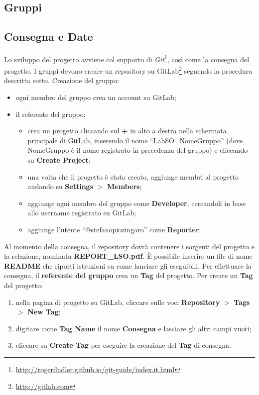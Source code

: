 \documentclass[12pt,a4paper,draft]{article}
\begin{document}
\subsection{Gruppi}
%


\subsection{Consegna e Date}
%
Lo sviluppo del progetto avviene col supporto di \textit{Git}\footnote{\url{http://rogerdudler.github.io/git-guide/index.it.html}}, così come la consegna del progetto.
I gruppi devono creare un repository su GitLab\footnote{\url{http://gitlab.com}} seguendo la procedura descritta sotto.
%
\newline\noindent
Creazione del gruppo:
\begin{itemize}
    \item ogni membro del gruppo crea un account su GitLab;
    \item il referente del gruppo:
    \begin{itemize}
        \item crea un progetto cliccando sul \textbf{+} in alto a destra nella schermata principale di GitLab, inserendo il nome ``LabSO\_NomeGruppo'' (dove NomeGruppo è il nome registrato in precedenza del gruppo) e cliccando su \textbf{Create Project};
        \item una volta che il progetto è stato creato, aggiunge membri al progetto andando su \textbf{Settings} $>$ \textbf{Members};
        \item aggiunge ogni membro del gruppo come \textbf{Developer}, cercandoli in base allo username registrato su GitLab;
        \item aggiunge l'utente ``@stefanopiozingaro'' come \textbf{Reporter}.
    \end{itemize}
\end{itemize}
%
Al momento della consegna, il repository dovrà contenere i sorgenti del progetto e la relazione, nominata \textbf{REPORT\_LSO.pdf}. 
È possibile inserire un file di nome \textbf{README} che riporti istruzioni su come lanciare gli eseguibili.
Per effettuare la consegna, il \textbf{referente del gruppo} crea un \textbf{Tag} del progetto. 
Per creare un \textbf{Tag} del progetto:
\begin{enumerate}
    \item nella pagina di progetto su GitLab, cliccare sulle voci \textbf{Repository} $>$ \textbf{Tags} $>$ \textbf{New Tag}; 
    \item digitare come \textbf{Tag Name} il nome \textbf{Consegna} e lasciare gli altri campi vuoti;
    \item cliccare su \textbf{Create Tag} per eseguire la creazione del \textbf{Tag} di consegna.
\end{enumerate}
\end{document}
